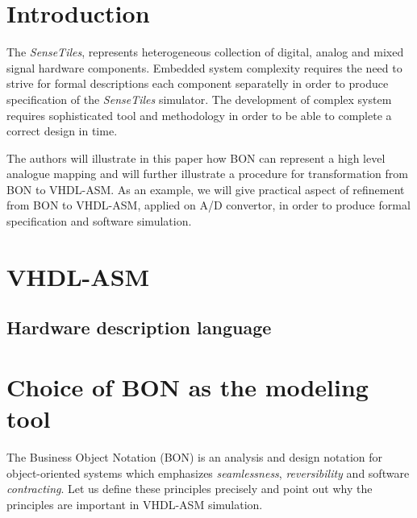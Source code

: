 \documentclass{article}
\newcommand{\STs}{\emph{SenseTiles}\xspace}
\begin{document}
\section{Introduction}
The \STs, represents heterogeneous collection of digital, analog 
and mixed signal hardware components. Embedded system complexity 
requires the need to strive for formal descriptions each component 
separatelly in order to produce specification of the \STs simulator. 
The development of complex system requires sophisticated tool and methodology 
in order to be able to complete a correct design in time.  

The authors will illustrate in this paper how BON can represent a high 
level analogue mapping and will further illustrate a procedure for 
transformation from BON to VHDL-ASM. As an example, 
we will give practical aspect of refinement from BON to VHDL-ASM,
applied on A/D convertor, in order to produce formal specification 
and software simulation.


\section{VHDL-ASM}
\subsection{Hardware description language}

\section{Choice of BON as the modeling tool}
The Business Object Notation (BON) is an analysis and design notation for 
object-oriented systems  which emphasizes \emph{seamlessness}, \emph{reversibility} and software \emph{contracting}.
Let us define these principles precisely and point out why the principles are important in VHDL-ASM simulation.
\end{document}
